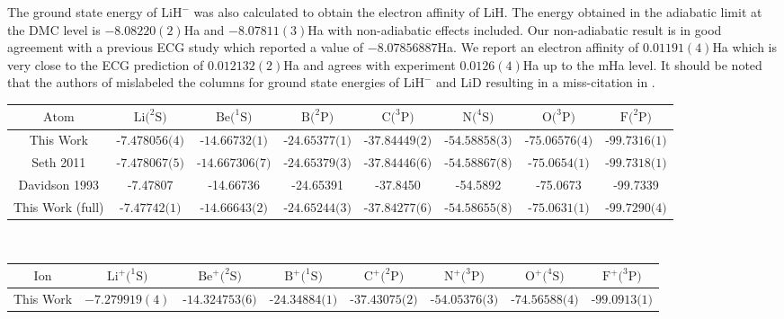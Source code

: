 \documentclass[aps,prl,superscriptaddress,groupedaddress]{revtex4}
\begin{document}
The ground state energy of $\text{LiH}^-$ was also calculated to obtain the electron affinity of LiH. The energy obtained in the adiabatic limit at the DMC level is $-8.08220(2)$Ha and $-8.07811(3)$Ha with non-adiabatic effects included. Our non-adiabatic result is in good agreement with a previous ECG study \cite{Bubin_LiH_noBO} which reported a value of $-8.07856887$Ha. We report an electron affinity of $0.01191(4)$Ha which is very close to the ECG prediction of $0.012132(2)$Ha and agrees with experiment $0.0126(4)$Ha up to the mHa level. It should be noted that the authors of \cite{Bubin_LiH_noBO} mislabeled the columns for ground state energies of $\text{LiH}^-$ and LiD resulting in a miss-citation in \cite{Mitroy_ECG}.

\begin{table*}[htpb!]
\setlength{\extrarowheight}{3pt}
\begin{tabular}{*{1}{*{8}{c}}}
\hline\hline
$\text{Atom}$ & $\text{Li}(^2\text{S)}$ & $\text{Be}(^1\text{S)}$ & $\text{B}(^2\text{P)}$ & $\text{C}(^3\text{P)}$ & $\text{N}(^4\text{S)}$ & $\text{O}(^3\text{P)}$ & $\text{F}(^2\text{P)}$ \\ \hline
This Work & $\text{-7.478056(4)}$ & $\text{-14.66732(1)}$ & $\text{-24.65377(1)}$ & $\text{-37.84449(2)}$ & $\text{-54.58858(3)}$ & $\text{-75.06576(4)}$ & $\text{-99.7316(1)}$ \\
Seth 2011 \cite{Seth_Bench} & $\text{-7.478067(5)}$ & $\text{-14.667306(7)}$ & $\text{-24.65379(3)}$ & $\text{-37.84446(6)}$ & $\text{-54.58867(8)}$ & $\text{-75.0654(1)}$ & $\text{-99.7318(1)}$ \\
Davidson 1993 \cite{Davidson_Atoms} &  -7.47807 & -14.66736 & -24.65391 & -37.8450 &-54.5892 & -75.0673 & -99.7339 \\
This Work (full) & $\text{-7.47742(1)}$ & $\text{-14.66643(2)}$ & $\text{-24.65244(3)}$ & $\text{-37.84277(6)}$ & $\text{-54.58655(8)}$ & $\text{-75.0631(1)}$ & $\text{-99.7290(4)}$ \\
\hline
\end{tabular} \\ 
\begin{tabular}{*{1}{*{8}{c}}}
$\text{Ion}$ & $\text{Li}^+(^1\text{S)}$ & $\text{Be}^+(^2\text{S)}$ & $\text{B}^+(^1\text{S)}$ & $\text{C}^+(^2\text{P)}$ & $\text{N}^+(^3\text{P)}$ & $\text{O}^+(^4\text{S)}$ & $\text{F}^+(^3\text{P)}$ \\ \hline
This Work & $-7.279919(4)$ & $\text{-14.324753(6)}$ & $\text{-24.34884(1)}$ & $\text{-37.43075(2)}$ & $\text{-54.05376(3)}$ & $\text{-74.56588(4)}$ & $\text{-99.0913(1)}$ \\

\end{tabular}
\end{table*}
\end{document}
